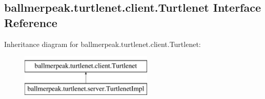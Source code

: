 \hypertarget{interfaceballmerpeak_1_1turtlenet_1_1client_1_1Turtlenet}{\subsection{ballmerpeak.\-turtlenet.\-client.\-Turtlenet Interface Reference}
\label{interfaceballmerpeak_1_1turtlenet_1_1client_1_1Turtlenet}
}
Inheritance diagram for ballmerpeak.\-turtlenet.\-client.\-Turtlenet\-:\begin{figure}[H]
\begin{center}
\leavevmode
\includegraphics[height=2.000000cm]{interfaceballmerpeak_1_1turtlenet_1_1client_1_1Turtlenet}
\end{center}
\end{figure}
